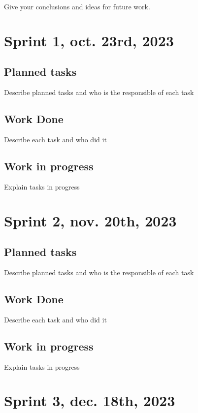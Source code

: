 \documentclass[preprint,12pt]{elsarticle}
\begin{document}
Give your conclusions and ideas for future work. 


\appendix

\section{Sprint 1, oct. 23rd, 2023}
\label{sprint1}
\subsection{Planned tasks}

Describe planned tasks  and who is the responsible of each task

\subsection{Work Done}

Describe each task and who did it 

\subsection{Work in progress}

Explain tasks in progress 

\section{Sprint 2, nov. 20th, 2023}
\label{sprint2}

\subsection{Planned tasks}

Describe planned tasks  and who is the responsible of each task

\subsection{Work Done}

Describe each task and who did it 

\subsection{Work in progress}

Explain tasks in progress 


\section{Sprint 3, dec. 18th, 2023}
\label{sprint3}
\end{document}
